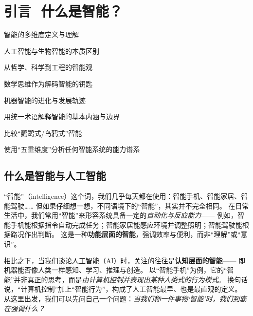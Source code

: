 \chapter{ 引言\,\,  什么是智能？}
 \begin{introduction}
  \item 智能的多维度定义与理解
  \item 人工智能与生物智能的本质区别
  \item 从哲学、科学到工程的智能观
  \item 数学思维作为解码智能的钥匙
  \item 机器智能的进化与发展轨迹
\end{introduction}

\begin{introduction}
  \item 用统一术语解释智能的基本内涵与边界
  \item 比较“鹦鹉式/乌鸦式”智能
  \item 使用“五重维度”分析任何智能系统的能力谱系
\end{introduction}


\section{什么是智能与人工智能}
“智能”（intelligence）这个词，我们几乎每天都在使用：智能手机、智能家居、智能驾驶……  
但如果仔细想一想，不同语境下的“智能”，其实并不完全相同。  
在日常生活中，我们常用“智能”来形容系统具备一定的\emph{自动化与反应能力}——  
例如，智能手机能根据指令自动完成任务；智能家居能感应环境并调整照明；智能驾驶能根据路况作出判断。  
这是一种\textbf{功能层面的智能}，强调效率与便利，而非“理解”或“意识”。  

相比之下，当我们谈论人工智能（AI）时，关注的往往是\textbf{认知层面的智能}——  
即机器能否像人类一样感知、学习、推理与创造。  
以“智能手机”为例，它的“智能”并非真正的思考，而是\emph{由计算机控制并表现出某种人类式的行为模式}。  
换句话说，“计算机控制”加上“智能行为”，构成了人工智能最早、也是最直观的定义。  
从这里出发，我们可以先问自己一个问题：\emph{当我们称一件事物‘智能’时，我们到底在强调什么？}  
 

